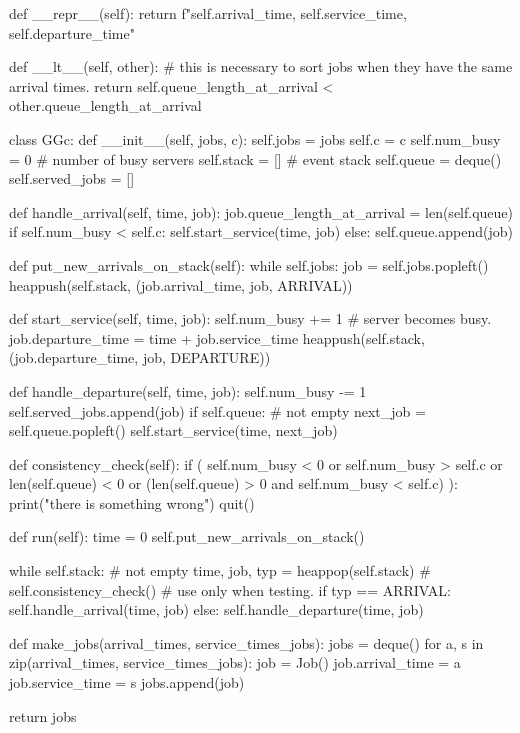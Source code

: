 \begin{exercise}
\begin{solution}
\begin{pyverbatim}
    def __repr__(self):
        return f"{self.arrival_time}, {self.service_time}, {self.departure_time}\n"

    def __lt__(self, other):
        # this is necessary to sort jobs when they have the same arrival times.
        return self.queue_length_at_arrival < other.queue_length_at_arrival


class GGc:
    def __init__(self, jobs, c):
        self.jobs = jobs
        self.c = c
        self.num_busy = 0  # number of busy servers
        self.stack = []  # event stack
        self.queue = deque()
        self.served_jobs = []

    def handle_arrival(self, time, job):
        job.queue_length_at_arrival = len(self.queue)
        if self.num_busy < self.c:
            self.start_service(time, job)
        else:
            self.queue.append(job)

    def put_new_arrivals_on_stack(self):
        while self.jobs:
            job = self.jobs.popleft()
            heappush(self.stack, (job.arrival_time, job, ARRIVAL))

    def start_service(self, time, job):
        self.num_busy += 1  # server becomes busy.
        job.departure_time = time + job.service_time
        heappush(self.stack, (job.departure_time, job, DEPARTURE))

    def handle_departure(self, time, job):
        self.num_busy -= 1
        self.served_jobs.append(job)
        if self.queue:  # not empty
            next_job = self.queue.popleft()
            self.start_service(time, next_job)

    def consistency_check(self):
        if (
            self.num_busy < 0
            or self.num_busy > self.c
            or len(self.queue) < 0
            or (len(self.queue) > 0 and self.num_busy < self.c)
        ):
            print("there is something wrong")
            quit()

    def run(self):
        time = 0
        self.put_new_arrivals_on_stack()

        while self.stack:  # not empty
            time, job, typ = heappop(self.stack)
            # self.consistency_check() # use only when testing.
            if typ == ARRIVAL:
                self.handle_arrival(time, job)
            else:
                self.handle_departure(time, job)

def make_jobs(arrival_times, service_times_jobs):
    jobs = deque()
    for a, s in zip(arrival_times, service_times_jobs):
        job = Job()
        job.arrival_time = a
        job.service_time = s
        jobs.append(job)

    return jobs
    
\end{pyverbatim}
\end{solution}
\end{exercise}


